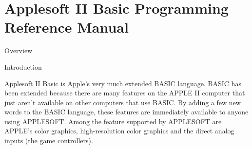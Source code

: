\documentclass[a4paper,12pt]{article}
\begin{document}
\section{Applesoft II Basic Programming Reference Manual}
\begin{flushleft}
Overview\par
Introduction
\end{flushleft}
\begin{displayquote}
Applesoft II Basic is Apple's very much extended BASIC language. BASIC has been extended because there are many features on the APPLE II computer that just aren't available on other computers that use BASIC. By adding a few new words to the BASIC language, these features are immediately available to anyone using APPLESOFT. Among the feature supported by APPLESOFT are APPLE's color graphics, high-resolution color graphics and the direct analog inputs (the game controllers).
\end{displayquote}
\end{document}
